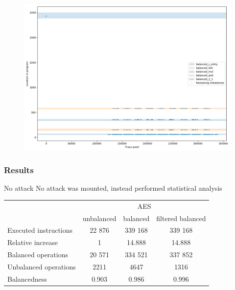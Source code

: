 \documentclass[11pt,t,usepdftitle=false,aspectratio=169]{beamer}
\begin{document}
\begin{frame}
  \begin{figure}
    \centering
    \includegraphics[height=\textheight]{imbalances-3.png}
  \end{figure}
\end{frame}

\begin{frame}[label=results]
  \frametitle{Results}
  \begin{alertblock}{No attack}
    No attack was mounted, instead performed statistical analysis
  \end{alertblock}
  \center
  \vfill
  \begin{tabular}{|l|c|c|c|}
    \hline
    & \multicolumn{3}{c|}{AES} \\
    \cline{2-4}
    & unbalanced & balanced & filtered balanced \\
    \cline{2-4}
    Executed instructions & 22 876 & 339 168 & 339 168\\
    Relative increase & 1 & 14.888 & 14.888 \\
    Balanced operations & 20 571 & 334 521 & 337 852\\
    Unbalanced operations & 2211 & 4647 & 1316 \\
    Balancedness      & 0.903 & 0.986 & 0.996\\
    \hline
  \end{tabular}
  \vfill
\end{frame}


\end{document}
